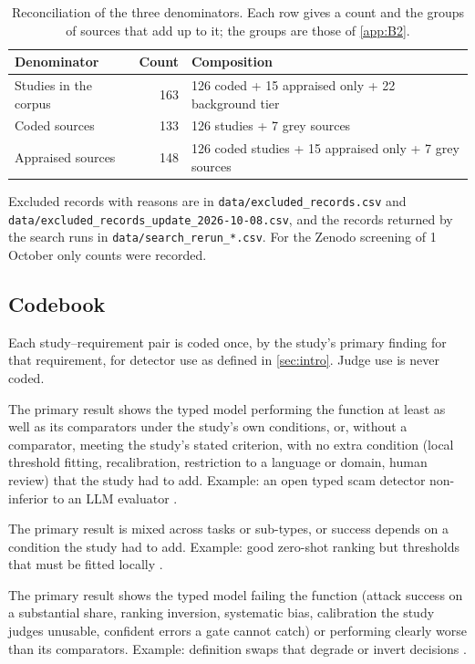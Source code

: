 \begin{table}[ht]
\centering
\caption{Reconciliation of the three denominators. Each row gives a count and the groups of sources that add up to it; the groups are those of \cref{app:B2}.}\label{tab:B1}
\small
\begin{tabularx}{\textwidth}{@{}l r L@{}}
\toprule
Denominator & Count & Composition \\
\midrule
Studies in the corpus & 163 & 126 coded + 15 appraised only + 22 background tier \\
Coded sources & 133 & 126 studies + 7 grey sources \\
Appraised sources & 148 & 126 coded studies + 15 appraised only + 7 grey sources \\
\bottomrule
\end{tabularx}
\end{table}

Excluded records with reasons are in \nolinkurl{data/excluded_records.csv} and \nolinkurl{data/excluded_records_update_2026-10-08.csv}, and the records returned by the search runs in \nolinkurl{data/search_rerun_*.csv}. For the Zenodo screening of 1 October only counts were recorded.

\subsection{Codebook}\label{app:B3}

Each study--requirement pair is coded once, by the study's primary finding for that requirement, for detector use as defined in \cref{sec:intro}. Judge use is never coded.

\begin{description}[style=nextline,leftmargin=1.5em]
\item[S (supports)] The primary result shows the typed model performing the function at least as well as its comparators under the study's own conditions, or, without a comparator, meeting the study's stated criterion, with no extra condition (local threshold fitting, recalibration, restriction to a language or domain, human review) that the study had to add. Example: an open typed scam detector non-inferior to an LLM evaluator \cite{arx23959}.
\item[Q (qualifies)] The primary result is mixed across tasks or sub-types, or success depends on a condition the study had to add. Example: good zero-shot ranking but thresholds that must be fitted locally \cite{arx29429}.
\item[N (negative)] The primary result shows the typed model failing the function (attack success on a substantial share, ranking inversion, systematic bias, calibration the study judges unusable, confident errors a gate cannot catch) or performing clearly worse than its comparators. Example: definition swaps that degrade or invert decisions \cite{arx26758}.
\end{description}

